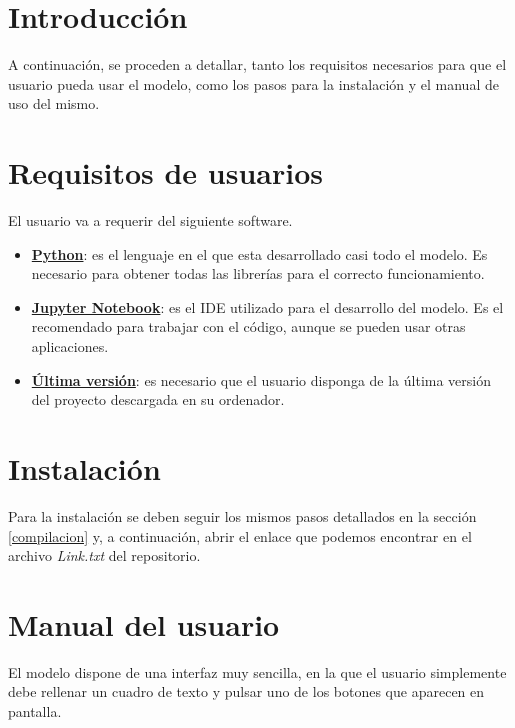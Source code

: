 
\section{Introducción}

A continuación, se proceden a detallar, tanto los requisitos necesarios para que el usuario pueda usar el modelo, como los pasos para la instalación y el manual de uso del mismo.


\section{Requisitos de usuarios}

El usuario va a requerir del siguiente software.

\begin{itemize}
    \item \textbf{\href{https://www.python.org/downloads/}{Python}}: es el lenguaje en el que esta desarrollado casi todo el modelo. Es necesario para obtener todas las librerías para el correcto funcionamiento.
    \item \textbf{\href{https://jupyter.org/install}{Jupyter Notebook}}: es el IDE utilizado para el desarrollo del modelo. Es el recomendado para trabajar con el código, aunque se pueden usar otras aplicaciones.
    \item \textbf{\href{https://github.com/Di3go99/Control-de-un-molino-eolico-usando-Aprendizaje-por-refuerzo-profundo}{Última versión}}: es necesario que el usuario disponga de la última versión del proyecto descargada en su ordenador.
\end{itemize}


\section{Instalación}

Para la instalación se deben seguir los mismos pasos detallados en la sección \ref{compilacion} y, a continuación, abrir el enlace que podemos encontrar en el archivo \textit{Link.txt} del repositorio.


\section{Manual del usuario}

El modelo dispone de una interfaz muy sencilla, en la que el usuario simplemente debe rellenar un cuadro de texto y pulsar uno de los botones que aparecen en pantalla.

